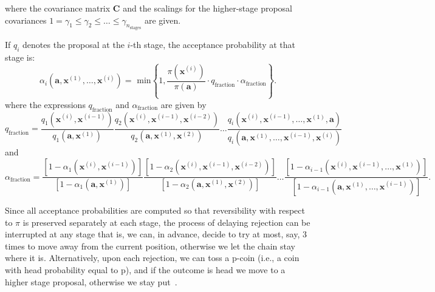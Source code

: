 where the covariance matrix $\mathbf{C}$ and the scalings for the higher-stage
proposal covariances
$1=\gamma_1\leqslant\gamma_2\leqslant\ldots\leqslant\gamma_{n_{\text{stages}}}$
are given.


If $q_i$ denotes the proposal at the $i$-th stage, the acceptance probability
at that stage is:
\begin{equation}\label{eq-alphas}
\alpha_i(\mathbf{a},\mathbf{x}^{(1)},\ldots,\mathbf{x}^{(i)}) = \text{ min}
\left\{1,
\frac {\pi(\mathbf{x}^{(i)})}{\pi(\mathbf{a})} \cdot q_{\text{fraction}} \cdot \alpha_{\text{fraction}}
\right\}.
\end{equation}
where the expressions $q_{\text{fraction}}$ and $\alpha_{\text{fraction}}$ are
given by
\begin{equation*}
q_{\text{fraction}}=
\frac{q_1(\mathbf{x}^{(i)},\mathbf{x}^{(i-1)})}{q_1(\mathbf{a},\mathbf{x}^{(1)})}
\frac{q_2(\mathbf{x}^{(i)},\mathbf{x}^{(i-1)},\mathbf{x}^{(i-2)})}{q_2(\mathbf{a},\mathbf{x}^{(1)},\mathbf{x}^{(2)})}
\ldots
\frac{q_i(\mathbf{x}^{(i)},\mathbf{x}^{(i-1)},\ldots,\mathbf{x}^{(1)},\mathbf{a})}{q_i(\mathbf{a},\mathbf{x}^{(1)},\ldots,\mathbf{x}^{(i-1)},\mathbf{x}^{(i)})}
\end{equation*}
and
\begin{equation*}
\alpha_{\text{fraction}}=
\frac{[1-\alpha_1(\mathbf{x}^{(i)},\mathbf{x}^{(i-1)})]}{[1-\alpha_1(\mathbf{a},\mathbf{x}^{(1)})]}
\frac{[1-\alpha_2(\mathbf{x}^{(i)},\mathbf{x}^{(i-1)},\mathbf{x}^{(i-2)})]}{[1-\alpha_2(\mathbf{a},\mathbf{x}^{(1)},\mathbf{x}^{(2)})]}
\ldots
\frac{[1-\alpha_{i-1}(\mathbf{x}^{(i)},\mathbf{x}^{(i-1)},\ldots,\mathbf{x}^{(1)})]}{[1-\alpha_{i-1}(\mathbf{a},\mathbf{x}^{(1)},\ldots,\mathbf{x}^{(i-1)})]}.
\end{equation*}


Since all acceptance probabilities are computed so that reversibility with
respect to $\pi$ is preserved separately at each stage, the process of delaying
rejection can be interrupted at any stage that is, we can, in advance, decide
to try at most, say, 3 times to move away from the current position, otherwise
we let the chain stay where it is. Alternatively, upon each rejection, we can
toss a p-coin (i.e., a coin with head probability equal to p), and if the
outcome is head we move to a higher stage proposal, otherwise we stay
put~\cite{HaLaMiSa06}.


